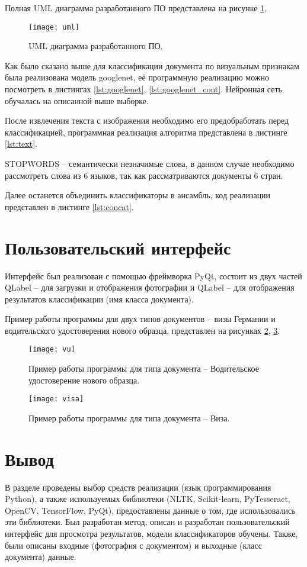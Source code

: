 Полная UML диаграмма разработанного ПО представлена на рисунке \ref{img:uml}.

\begin{figure}[H]
	\centering
	\texttt{[image: uml]}
	\caption{UML диаграмма разработанного ПО. }
	\label{img:uml}
\end{figure}

Как было сказано выше для классификации документа по визуальным признакам была реализована модель googlenet, её программную реализацию можно посмотреть в листингах \ref{lst:googlenet}, \ref{lst:googlenet_cont}. Нейронная сеть обучалась на описанной выше выборке.

После извлечения текста с изображения необходимо его предобработать перед классификацией, программная реализация алгоритма представлена в листинге \ref{lst:text}. 

STOPWORDS -- семантически незначимые слова, в данном случае необходимо рассмотреть слова из 6 языков, так как рассматриваются документы 6 стран.

Далее останется объединить классификаторы в ансамбль, код реализации представлен в листинге \ref{lst:concat}. 

\section{Пользовательский интерфейс }

Интерфейс был реализован с помощью фреймворка PyQt, состоит из двух частей QLabel -- для загрузки и отображения фотографии и QLabel -- для отображения результатов классификации (имя класса документа).

Пример работы программы для двух типов документов -- визы Германии и водительского удостоверения нового образца, представлен на рисунках \ref{img:vu}, \ref{img:visa}.

\begin{figure}[H]
	\centering
	\texttt{[image: vu]}
	\caption{Пример работы программы для типа документа -- Водительское удостоверение нового образца. }
	\label{img:vu}
\end{figure}

\begin{figure}[H]
	\centering
	\texttt{[image: visa]}
	\caption{Пример работы программы для типа документа -- Виза. }
	\label{img:visa}
\end{figure}

\section{Вывод}

В разделе проведены выбор средств реализации (язык программирования Python), а также используемых библиотеки (NLTK, Scikit-learn, PyTesseract, OpenCV, TensorFlow, PyQt), предоставлены данные о том, где использовались эти библиотеки. Был разработан метод, описан и разработан пользовательский интерфейс для просмотра результатов, модели классификаторов обучены. Также, были описаны входные (фотография с документом) и выходные (класс документа) данные.
